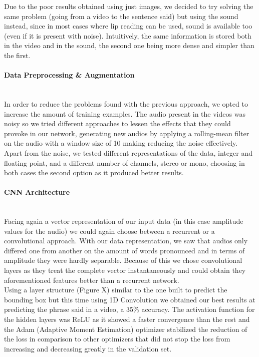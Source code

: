 \documentclass{article}[10pt]
\begin{document}
\begin{multicols}{2}
Due to the poor results obtained using just images, we decided to try solving
the same problem (going from a video to the sentence said) but using the sound
instead, since in most cases where lip reading can be used, sound is available
too (even if it is present with noise). Intuitively, the same information is
stored both in the video and in the sound, the second one being more dense and
simpler than the first.

\paragraph{Data Preprocessing \& Augmentation} ~\\

In order to reduce the problems found with the previous approach, we opted to
increase the amount of training examples. The audio present in the videos was
noisy so we tried different approaches to lessen the effects that they could
provoke in our network, generating new audios by applying a rolling-mean filter
on the audio with a window size of 10 making reducing the noise effectively.\\

Apart from the noise, we tested different representations of the data, integer
and floating point, and a different number of channels, stereo or mono, choosing
in both cases the second option as it produced better results.

\paragraph{CNN Architecture} ~\\

Facing again a vector representation of our input data (in this case
amplitude values for the audio) we could again choose between a recurrent or a
convolutional approach. With our data representation, we saw that audios only
differed one from another on the amount of words pronounced and in terms
of amplitude they were hardly separable. Because of this we chose convolutional
layers as they treat the complete vector instantaneously and could obtain they
aforementioned features better than a recurrent network. \\

Using a layer structure (Figure X) similar to the one built to predict the
bounding box but this time using 1D Convolution we obtained our best results at
predicting the phrase said in a video, a 35\% accuracy. The activation function
for the hidden layers was ReLU as it showed a faster convergence than the rest
and the Adam (Adaptive Moment Estimation) optimizer stabilized the reduction of
the loss in comparison to other optimizers that did not stop the loss from
increasing and decreasing greatly in the validation set.


\end{multicols}
\end{document}
